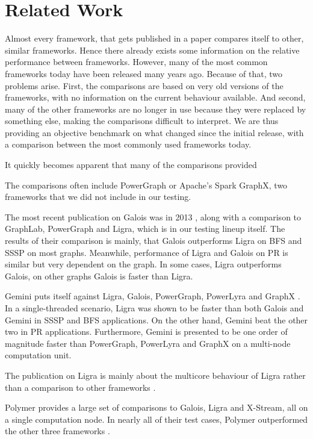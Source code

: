 

\section{Related Work}

Almost every framework, that gets published in a paper compares itself to other, similar frameworks. 
Hence there already exists some information on the relative performance between frameworks. 
However, many of the most common frameworks today have been released many years ago. 
Because of that, two problems arise.
First, the comparisons are based on very old versions of the frameworks, with no information on the current behaviour available. 
And second, many of the other frameworks are no longer in use because they were replaced by something else, making the comparisons difficult to interpret.
We are thus providing an objective benchmark on what changed since the initial release, with a comparison between the most commonly used frameworks today. 

It quickly becomes apparent that many of the comparisons provided 

The comparisons often include PowerGraph or Apache's Spark GraphX, two frameworks that we did not include in our testing.




The most recent publication on Galois was in 2013 \cite{Galois}, along with a comparison to GraphLab, PowerGraph and Ligra, which is in our testing lineup itself. The results of their comparison is mainly, that Galois outperforms Ligra on BFS and SSSP on most graphs. Meanwhile, performance of Ligra and Galois on PR is similar but very dependent on the graph. In some cases, Ligra outperforms Galois, on other graphs Galois is faster than Ligra.

Gemini puts itself against Ligra, Galois, PowerGraph, PowerLyra and GraphX \cite{Gemini}.
In a single-threaded scenario, Ligra was shown to be faster than both Galois and Gemini in SSSP and BFS applications. 
On the other hand, Gemini beat the other two in PR applications.
Furthermore, Gemini is presented to be one order of magnitude faster than PowerGraph, PowerLyra and GraphX on a multi-node computation unit.

The publication on Ligra is mainly about the multicore behaviour of Ligra rather than a comparison to other frameworks \cite{Ligra}.

Polymer provides a large set of comparisons to Galois, Ligra and X-Stream, all on a single computation node. In nearly all of their test cases, Polymer outperformed the other three frameworks \cite{Polymer}. 


